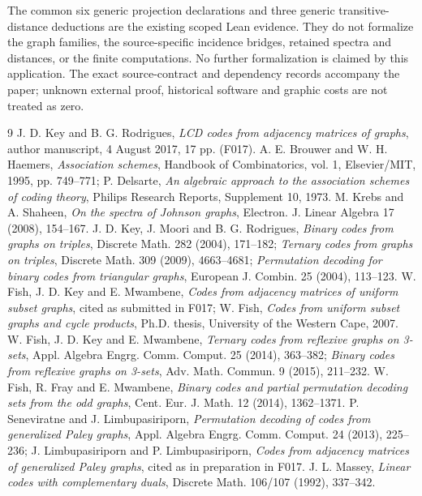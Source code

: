 The common six generic projection declarations and three generic
transitive-distance deductions are the existing scoped Lean evidence.
They do not formalize the graph families, the source-specific incidence
bridges, retained spectra and distances, or the finite computations.
No further formalization is claimed by this application. The exact
source-contract and dependency records accompany the paper; unknown
external proof, historical software and graphic costs are not treated
as zero.

\begin{thebibliography}{9}
 J. D. Key and B. G. Rodrigues,
\emph{LCD codes from adjacency matrices of graphs}, author manuscript,
4 August 2017, 17 pp. (F017).
 A. E. Brouwer and W. H. Haemers,
\emph{Association schemes}, Handbook of Combinatorics, vol. 1,
Elsevier/MIT, 1995, pp. 749--771; P. Delsarte,
\emph{An algebraic approach to the association schemes of coding theory},
Philips Research Reports, Supplement 10, 1973.
 M. Krebs and A. Shaheen,
\emph{On the spectra of Johnson graphs}, Electron. J. Linear Algebra
17 (2008), 154--167.
 J. D. Key, J. Moori and B. G. Rodrigues,
\emph{Binary codes from graphs on triples}, Discrete Math. 282 (2004),
171--182; \emph{Ternary codes from graphs on triples}, Discrete Math.
309 (2009), 4663--4681; \emph{Permutation decoding for binary codes
from triangular graphs}, European J. Combin. 25 (2004), 113--123.
 W. Fish, J. D. Key and E. Mwambene,
\emph{Codes from adjacency matrices of uniform subset graphs}, cited
as submitted in F017; W. Fish, \emph{Codes from uniform subset graphs
and cycle products}, Ph.D. thesis, University of the Western Cape, 2007.
 W. Fish, J. D. Key and E. Mwambene,
\emph{Ternary codes from reflexive graphs on 3-sets}, Appl. Algebra
Engrg. Comm. Comput. 25 (2014), 363--382; \emph{Binary codes from
reflexive graphs on 3-sets}, Adv. Math. Commun. 9 (2015), 211--232.
 W. Fish, R. Fray and E. Mwambene,
\emph{Binary codes and partial permutation decoding sets from the odd
graphs}, Cent. Eur. J. Math. 12 (2014), 1362--1371.
 P. Seneviratne and J. Limbupasiriporn,
\emph{Permutation decoding of codes from generalized Paley graphs},
Appl. Algebra Engrg. Comm. Comput. 24 (2013), 225--236;
J. Limbupasiriporn and P. Limbupasiriporn,
\emph{Codes from adjacency matrices of generalized Paley graphs},
cited as in preparation in F017.
 J. L. Massey, \emph{Linear codes with complementary
duals}, Discrete Math. 106/107 (1992), 337--342.
\end{thebibliography}

